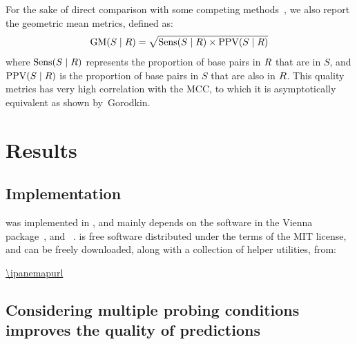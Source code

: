 \documentclass[a4,center,fleqn]{NAR}
\begin{document}
For the sake of direct comparison with some competing methods~\cite{Spasic2017}, we also report the geometric mean metrics, defined as:
$$ \text{GM}(S\mid R)=\sqrt{\text{Sens}(S\mid R)\times \text{PPV}(S\mid R)} $$
where $\text{Sens}(S\mid R)$ represents the proportion of base pairs in $R$ that are in $S$, and $\text{PPV}(S\mid R)$ is the proportion of base pairs in $S$ that are also in $R$. This quality metrics has very high correlation with the MCC, to which it is asymptotically equivalent as shown by~Gorodkin\etal\cite{Gorodkin2001}.

\section*{Results}

\subsection*{Implementation}

\OurTool{} was implemented in , and mainly depends on the  software in the Vienna package~\cite{Lorenz2011}, and ~\cite{Pedregosa2012}. \OurTool{} is free software distributed under the terms of the MIT license, and can be freely downloaded, along with a collection of helper utilities, from:

{\centering \url{\ipanemapurl}\\}

\subsection*{Considering multiple probing conditions improves the quality of predictions}\label{sec:cordero}

%


\end{document}
